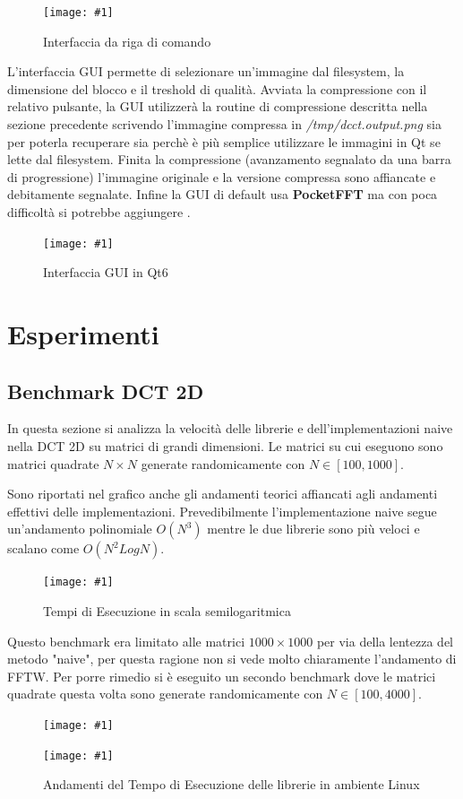 \documentclass[a4paper,11pt,oneside, table]{article}
\newcommand{\putimage}[4] {
	\begin{figure}[H]
	    \centering
	    \texttt{[image: \#1]}
	    \caption{#2}\label{#3}
	\end{figure}
}
\newcommand{\putsubimage}[5] {
  \begin{minipage}{{#4}\linewidth}
	    \centering
      \texttt{[image: \#1]}
	    \caption{#2}\label{#3}
	\end{minipage}
}
\newcommand{\putimagecouple}[2] {
  \begin{figure}[!htb]
      \centering
      #1
      \hspace{0.5cm}
      #2
  \end{figure}
}
\begin{document}
\putimage{images/interface-cli.png}{Interfaccia da riga di comando}{png:interface_cli}{0.99}

L'interfaccia GUI permette di selezionare un'immagine dal filesystem, la dimensione del blocco e il treshold di qualit\`a.
Avviata la compressione con il relativo pulsante, la GUI utilizzer\`a la routine di compressione descritta nella sezione precedente scrivendo l'immagine compressa in \textit{/tmp/dcct.output.png} sia per poterla recuperare sia perch\`e \`e pi\`u semplice utilizzare le immagini in Qt se lette dal filesystem.
Finita la compressione (avanzamento segnalato da una barra di progressione) l'immagine originale e la versione compressa sono affiancate e debitamente segnalate.
Infine la GUI di default usa \textbf{PocketFFT} ma con poca difficolt\`a si potrebbe aggiungere .

\putimage{images/interface-gui.png}{Interfaccia GUI in Qt6}{png:interface_gui}{0.99}

\section{Esperimenti}

\subsection{Benchmark DCT 2D}

In questa sezione si analizza la velocit\`a delle librerie e dell'implementazioni naive nella DCT 2D su matrici di grandi dimensioni.
Le matrici su cui eseguono sono matrici quadrate $N \times N$ generate randomicamente con $N \in [100, 1000]$.

Sono riportati nel grafico anche gli andamenti teorici affiancati agli andamenti effettivi delle implementazioni.
Prevedibilmente l'implementazione naive segue un'andamento polinomiale $O(N^3)$ mentre le due librerie sono pi\`u veloci e scalano come $O(N^2 Log N)$.

\putimage{images/actuator-trends.png}{Tempi di Esecuzione in scala semilogaritmica}{png:actuator-trends}{0.99}

Questo benchmark era limitato alle matrici $1000 \times 1000$ per via della lentezza del metodo "naive", per questa ragione non si vede molto chiaramente l'andamento di FFTW.
Per porre rimedio si \`e eseguito un secondo benchmark dove le matrici quadrate questa volta sono generate randomicamente con $N \in [100, 4000]$.

\putimagecouple
  {\putsubimage{./images/benchmark-libraries-wsl.png}{Andamenti del Tempo di Esecuzione delle librerie in ambiente WSL}{png:benchmark-libraries-wsl}{0.45}{0.99}}
  {\putsubimage{./images/benchmark-libraries-linux.png}{Andamenti del Tempo di Esecuzione delle librerie in ambiente Linux}{png:benchmark-libraries-linux}{0.45}{0.99}}
\end{document}

